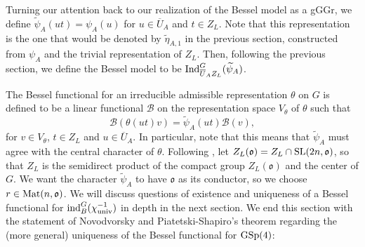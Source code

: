 \documentclass[11pt,letterpaper]{article}
\newcommand{\calB}{\mathcal{B}}
\newcommand{\goth}{\mathfrak}
\newcommand{\SL}{\textup{SL}}
\newcommand{\GSp}{\textup{GSp}}
\newcommand{\Ind}{\textup{Ind}}
\newcommand{\ind}{\textup{ind}}
\theoremstyle{remark}
\numberwithin{equation}{section}
\begin{document}

Turning our attention back to our realization of the Bessel model as a gGGr, we define $\widetilde{\psi}_A(ut) = \psi_A(u)$ for $u \in \overline{U}_A$ and $t \in Z_L$. Note that this representation is the one that would be denoted by $\widetilde{\eta}_{A,1}$ in the previous section, constructed from $\psi_A$ and the trivial representation of $Z_L$. Then, following the previous section, we define the Bessel model to be $\Ind_{\overline{U}_AZ_L}^G(\widetilde{\psi}_A)$.

The Bessel functional for an irreducible admissible representation $\theta$ on $G$ is defined to be a linear functional $\calB$ on the representation space $V_{\theta}$ of $\theta$ such that $$\calB(\theta(ut) v) = \widetilde{\psi}_A(ut)\calB(v),$$ for $v \in V_{\theta}$, $t \in Z_L$ and $u \in \overline{U}_A$. In particular, note that this means that $\widetilde{\psi}_A$ must agree with the central character of $\theta$. Following \cite{BFF}, let $Z_L(\goth{o}) = Z_L \cap \SL(2n,\goth{o})$, so that $Z_L$ is the semidirect product of the compact group $Z_L(\goth{o})$ and the center of $G$. We want the character $\widetilde{\psi}_A$ to have $\goth{o}$ as its conductor, so we choose $r \in \textup{Mat}(n,\goth{o})$. We will discuss questions of existence and uniqueness of a Bessel functional for $\ind_B^G(\chi_{\textup{univ}}^{-1})$ in depth in the next section. We end this section with the statement of Novodvorsky and Piatetski-Shapiro's theorem regarding the (more general) uniqueness of the Bessel functional for $\GSp(4)$:


\end{document}

